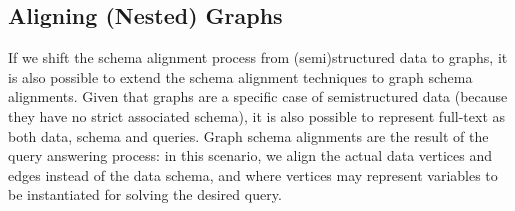\subsection{Aligning (Nested) Graphs}\label{sss:ngdi}
If we shift the schema alignment process from (semi)structured data to graphs, it is also possible to extend the schema alignment techniques to graph schema alignments. Given that graphs are a specific case of semistructured data (because they have no strict associated schema), it is also possible to represent full-text as both data, schema and queries. Graph schema alignments are the result of the query answering process: in this scenario, we align the actual data vertices and edges instead of the data schema, and where vertices may represent variables to be instantiated for solving the desired query.

